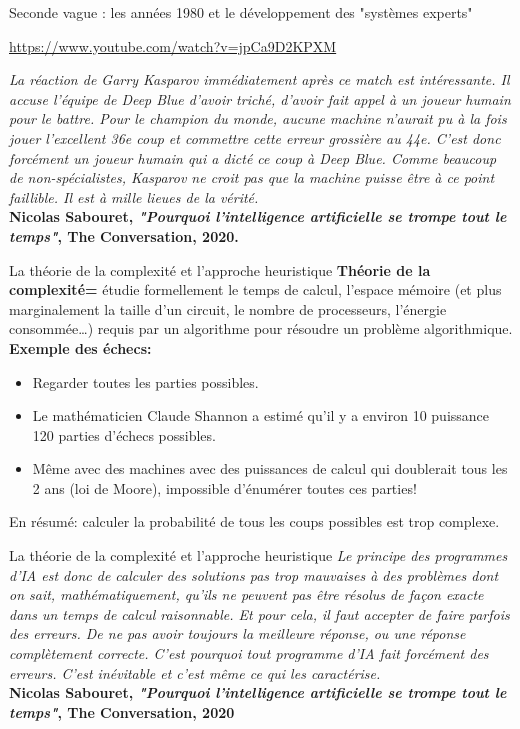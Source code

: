 \begin{frame}{Seconde vague : les années 1980 et le développement des "systèmes experts"}

\url{https://www.youtube.com/watch?v=jpCa9D2KPXM}

\begin{block}{}
    \centering
    {\small
    \textit{La réaction de Garry Kasparov immédiatement après ce match est intéressante. Il accuse l’équipe de Deep Blue d’avoir triché, d’avoir fait appel à un joueur humain pour le battre. Pour le champion du monde, aucune machine n’aurait pu à la fois jouer l’excellent 36e coup et commettre cette erreur grossière au 44e. C’est donc forcément un joueur humain qui a dicté ce coup à Deep Blue. Comme beaucoup de non-spécialistes, Kasparov ne croit pas que la machine puisse être à ce point faillible. Il est à mille lieues de la vérité.}}\\
    \textbf{Nicolas Sabouret, \textit{"Pourquoi l’intelligence artificielle se trompe tout le temps"}, The Conversation, 2020.}
\end{block}
\end{frame}

\begin{frame}{La théorie de la complexité et l'approche heuristique}
\textbf{Théorie de la complexité=} étudie formellement le temps de calcul, l'espace mémoire (et plus marginalement la taille d'un circuit, le nombre de processeurs, l'énergie consommée…) requis par un algorithme pour résoudre un problème algorithmique.\\
\vspace{3mm}
\textbf{Exemple des échecs:}
\begin{itemize}
    \item Regarder toutes les parties possibles.
    \item Le mathématicien Claude Shannon a estimé qu’il y a environ 10 puissance 120 parties d’échecs possibles.
    \item Même avec des machines avec des puissances de calcul qui doublerait tous les 2 ans (loi de Moore), impossible d'énumérer toutes ces parties!
\end{itemize}

En résumé: calculer la probabilité de tous les coups possibles est trop complexe.
\end{frame}

\begin{frame}{La théorie de la complexité et l'approche heuristique}
    \centering
    {\small
    \textit{
    Le principe des programmes d’IA est donc de calculer des solutions pas trop mauvaises à des problèmes dont on sait, mathématiquement, qu’ils ne peuvent pas être résolus de façon exacte dans un temps de calcul raisonnable. Et pour cela, il faut accepter de faire parfois des erreurs. De ne pas avoir toujours la meilleure réponse, ou une réponse complètement correcte. C’est pourquoi tout programme d’IA fait forcément des erreurs. C’est inévitable et c’est même ce qui les caractérise.}
    }\\
\textbf{Nicolas Sabouret, \textit{"Pourquoi l’intelligence artificielle se trompe tout le temps"}, The Conversation, 2020}
\end{frame}

